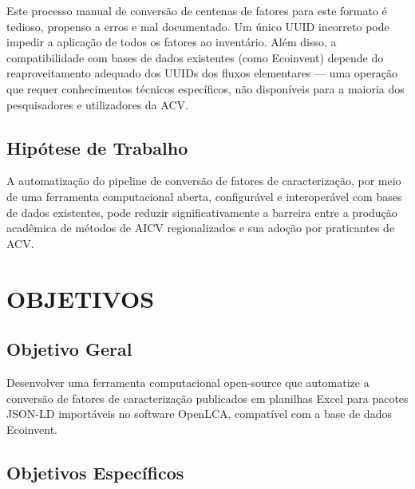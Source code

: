 Este processo manual de conversão de centenas de fatores para este formato é tedioso, propenso a erros e mal documentado. Um único UUID incorreto pode impedir a aplicação de todos os fatores ao inventário. Além disso, a compatibilidade com bases de dados existentes (como Ecoinvent) depende do reaproveitamento adequado dos UUIDs dos fluxos elementares — uma operação que requer conhecimentos técnicos específicos, não disponíveis para a maioria dos pesquisadores e utilizadores da ACV.

\subsection{Hip\'otese de Trabalho}

A automatização do pipeline de conversão de fatores de caracterização, por meio de uma ferramenta computacional aberta, configurável e interoperável com bases de dados existentes, pode reduzir significativamente a barreira entre a produção acadêmica de métodos de AICV regionalizados e sua adoção por praticantes de ACV.

\section{OBJETIVOS}

\subsection{Objetivo Geral}

Desenvolver uma ferramenta computacional open-source que automatize a convers\~ao de fatores de caracteriza\c{c}\~ao publicados em planilhas Excel para pacotes JSON-LD import\'aveis no software OpenLCA, compatível com a base de dados Ecoinvent.

\subsection{Objetivos Espec\'ificos}

